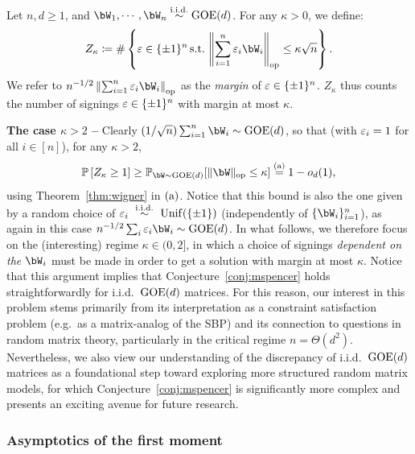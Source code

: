 Let $n, d \geq 1$, and $\bW_1, \cdots, \bW_n \iid \GOE(d)$.
For any $\kappa > 0$, we define: 
\begin{equation}
    \label{eq:def_Zkappa}
    Z_\kappa \coloneqq \# \left\{\eps \in \{\pm 1\}^n \, \textrm{s.t.} \, \left\|\sum_{i=1}^n \eps_i \bW_i\right\|_{\op} \leq \kappa \sqrt{n} \right\}.
\end{equation}
We refer to $n^{-1/2} \left\|\sum_{i=1}^n \eps_i \bW_i\right\|_{\op}$ as the \emph{margin} of $\varepsilon \in \{\pm 1\}^n$. 
$Z_\kappa$ thus counts the number of signings $\varepsilon \in \{\pm 1\}^n$ with margin at most $\kappa$.

\myskip
\textbf{The case $\kappa > 2$ --}
Clearly $(1/\sqrt{n})\sum_{i=1}^n \bW_i \sim \GOE(d)$, so that (with $\varepsilon_i = 1$ for all $i \in [n]$), for any $\kappa > 2$, 
\begin{equation*}
    \bbP\left[Z_\kappa \geq 1\right] \geq \bbP_{\bW \sim \GOE(d)}[\|\bW\|_\op \leq \kappa] \aeq 1 - \smallO_d(1),
\end{equation*}
using Theorem~\ref{thm:wigner} in $(\rm a)$.
Notice that this bound is also the one given by a random choice of $\varepsilon_i~\overset{\mathrm{i.i.d.}}{\sim}~\mathrm{Unif}(\{\pm 1\})$ (independently of $\{\bW_i\}_{i=1}^n$), as again in this case 
$n^{-1/2}\sum_{i} \eps_i \bW_i\sim\GOE(d)$.
In what follows, we therefore focus on the (interesting) regime $\kappa \in (0,2]$, in which a choice of signings \emph{dependent on the $\bW_i$} must be made in order to 
get a solution with margin at most $\kappa$.
Notice that this argument implies that Conjecture~\ref{conj:mspencer} holds straightforwardly for i.i.d.\ $\mathrm{GOE}(d)$ matrices.
For this reason, our interest in this problem stems primarily from its interpretation as a constraint satisfaction problem (e.g.\ as a matrix-analog of the SBP) and its connection to questions in random matrix theory, particularly in the critical regime $n = \Theta(d^2)$.
Nevertheless, we also view our understanding of the discrepancy of i.i.d.\ $\mathrm{GOE}(d)$ matrices as a foundational step toward exploring more structured random matrix models, for which Conjecture~\ref{conj:mspencer} is significantly more complex and presents an exciting avenue for future research.

\subsubsection{Asymptotics of the first moment}

